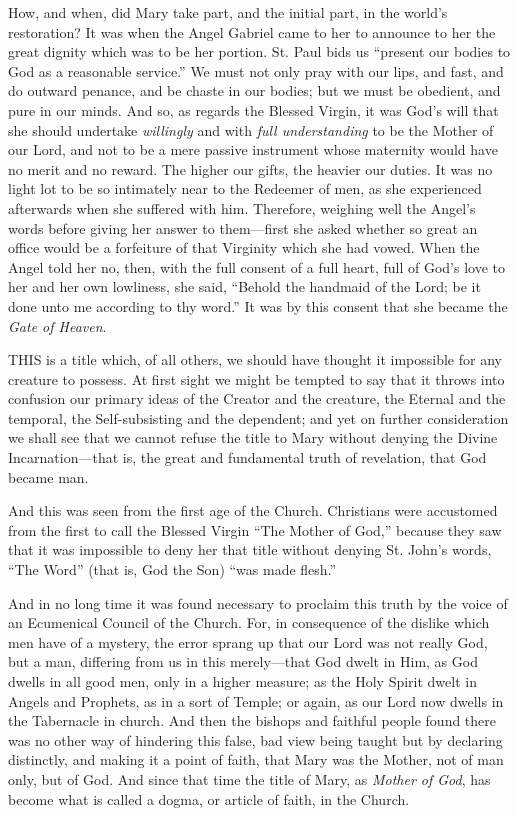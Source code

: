 How, and when, did Mary take
part, and the initial part, in the world's restoration? It was when the
Angel Gabriel came to her to announce to her the great dignity which was
to be her portion. St. Paul bids us ``present our bodies to God as a
reasonable service.'' We must not only pray with our lips, and fast, and
do outward penance, and be chaste in our bodies; but we must be
obedient, and pure in our minds. And so, as regards the Blessed Virgin,
it was God's will that she should undertake \emph{willingly} and with \emph{full
understanding} to be the Mother of our Lord, and not to be a mere
passive instrument whose maternity would have no merit and no reward.
The higher our gifts, the heavier our duties. It was no light lot to be
so intimately near to the Redeemer of men, as she experienced afterwards
when she suffered with him. Therefore, weighing well the Angel's words
before giving her answer to them—first she asked whether so great an
office would be a forfeiture of that Virginity which she had vowed. When
the Angel told her no, then, with the full consent of a full heart,
full of God's love to her and her own lowliness, she said, ``Behold the
handmaid of the Lord; be it done unto me according to thy word.'' It was
by this consent that she became the \emph{Gate of Heaven}.



THIS
is a title which, of all others, we should have thought it impossible
for any creature to possess. At first sight we might be tempted to say
that it throws into confusion our primary ideas of the Creator and the
creature, the Eternal and the temporal, the Self-subsisting and the
dependent; and yet on further consideration we shall see that we cannot
refuse the title to Mary without denying the Divine Incarnation—that
is, the great and fundamental truth of revelation, that God became man.

And this was seen from the first
age of the Church. Christians were accustomed from the first to call the
Blessed Virgin ``The Mother of God,'' because they saw that it was
impossible to deny her that title without denying St. John's words, ``The
Word'' (that is, God the Son) ``was made flesh.''

And in no long time it was found
necessary to proclaim this truth by the voice of an Ecumenical Council
of the Church. For, in consequence of the dislike which men have of
a mystery, the error sprang up that our Lord was not really God, but a
man, differing from us in this merely—that God dwelt in Him, as God
dwells in all good men, only in a higher measure; as the Holy Spirit
dwelt in Angels and Prophets, as in a sort of Temple; or again, as our
Lord now dwells in the Tabernacle in church. And then the bishops and
faithful people found there was no other way of hindering this false,
bad view being taught but by declaring distinctly, and making it a point
of faith, that Mary was the Mother, not of man only, but of God. And
since that time the title of Mary, as \emph{Mother of God}, has become
what is called a dogma, or article of faith, in the Church.

